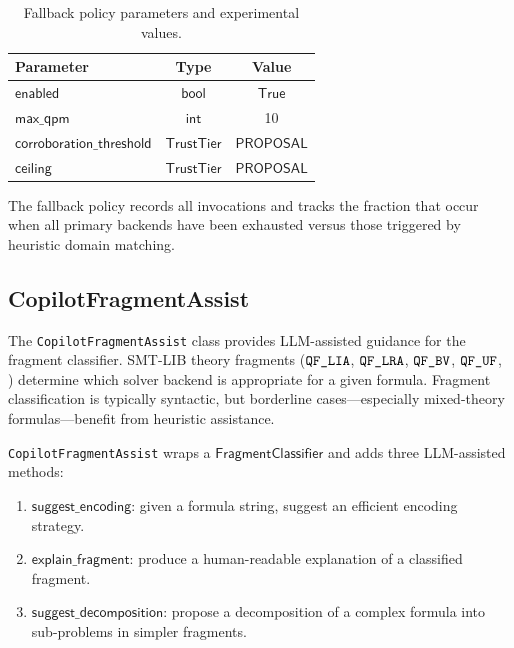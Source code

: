\documentclass[11pt]{article}
\newcommand{\CopFragment}{\texttt{CopilotFragmentAssist}}
\begin{document}
\begin{table}[ht]
\centering
\caption{Fallback policy parameters and experimental values.}
\label{tab:fallback-params}
\begin{tabular}{lcc}
\hline
\textbf{Parameter} & \textbf{Type} & \textbf{Value} \\
\hline
$\mathsf{enabled}$ & $\mathsf{bool}$ & $\mathsf{True}$ \\
$\mathsf{max\_qpm}$ & $\mathsf{int}$ & 10 \\
$\mathsf{corroboration\_threshold}$ & $\mathsf{TrustTier}$
  & $\mathsf{PROPOSAL}$ \\
$\mathsf{ceiling}$ & $\mathsf{TrustTier}$
  & $\mathsf{PROPOSAL}$ \\
\hline
\end{tabular}
\end{table}

The fallback policy records all invocations and tracks the
fraction that occur when all primary backends have been exhausted
versus those triggered by heuristic domain matching.

\subsection{CopilotFragmentAssist}\label{sec:fragment-assist}

The \CopFragment{} class provides LLM-assisted guidance for the
fragment classifier.  SMT-LIB theory fragments
($\texttt{QF\_LIA}$, $\texttt{QF\_LRA}$, $\texttt{QF\_BV}$, $\texttt{QF\_UF}$, \etc) determine which
solver backend is appropriate for a given formula.  Fragment
classification is typically syntactic, but borderline cases---especially
mixed-theory formulas---benefit from heuristic assistance.

\CopFragment{} wraps a $\mathsf{FragmentClassifier}$ and adds three
LLM-assisted methods:

\begin{enumerate}
  \item $\mathsf{suggest\_encoding}$: given a formula string,
    suggest an efficient encoding strategy.
  \item $\mathsf{explain\_fragment}$: produce a human-readable
    explanation of a classified fragment.
  \item $\mathsf{suggest\_decomposition}$: propose a decomposition
    of a complex formula into sub-problems in simpler fragments.
\end{enumerate}
\end{document}
